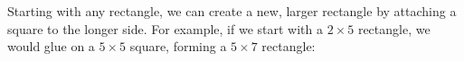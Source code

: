 \documentclass[12pt]{exam}
\begin{document}
\begin{questions}




	\question[8] Starting with any rectangle, we can create a new, larger rectangle by attaching a square to the longer side.  For example, if we start with a $2\times 5$ rectangle, we would glue on a $5\times 5 $ square, forming a $5 \times 7$ rectangle:


\end{questions}
\end{document}
